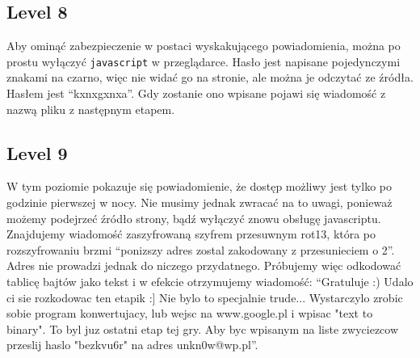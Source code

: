 \documentclass[11pt]{article}
\begin{document}
\subsection{Level 8}

Aby ominąć zabezpieczenie w postaci wyskakującego powiadomienia, można po prostu wyłączyć \texttt{javascript} w przeglądarce. Hasło jest napisane pojedynczymi znakami na czarno, więc nie widać go na stronie, ale można je odczytać ze źródła. Hasłem jest ``kxnxgxnxa''. Gdy zostanie ono wpisane pojawi się wiadomość z nazwą pliku z następnym etapem.

\subsection{Level 9}

W tym poziomie pokazuje się powiadomienie, że dostęp możliwy jest tylko po godzinie pierwszej w nocy. Nie musimy jednak zwracać na to uwagi, ponieważ możemy podejrzeć źródło strony, bądź wyłączyć znowu obsługę javascriptu. Znajdujemy wiadomość zaszyfrowaną szyfrem przesuwnym rot13, która po rozszyfrowaniu brzmi ``ponizszy adres zostal zakodowany z przesunieciem o 2''. Adres nie prowadzi jednak do niczego przydatnego. Próbujemy więc odkodować tablicę bajtów jako tekst i w efekcie otrzymujemy wiadomość: \newline ``Gratuluje :) Udalo ci sie rozkodowac ten etapik :] Nie bylo to specjalnie trude... Wystarczylo zrobic sobie program konwertujacy, lub wejsc na www.google.pl i wpisac "text to binary". To byl juz ostatni etap tej gry. Aby byc wpisanym na liste zwyciezcow przeslij haslo "bezkvu6r" na adres unkn0w@wp.pl''.
\end{document}
